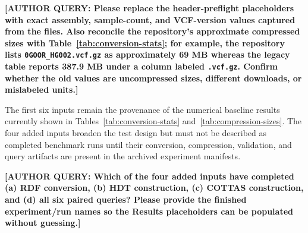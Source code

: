 \documentclass[pdflatex,sn-mathphys-num]{sn-jnl}%
\newenvironment{revision}{\begingroup\color{revisionblue}}{\endgroup}%
\newcommand{\authorquery}[1]{%
  \par\smallskip\noindent
  {\color{queryorange}\textbf{[AUTHOR QUERY: #1]}}%
  \par\smallskip
}%
\theoremstyle{thmstyleone}%
\theoremstyle{thmstyletwo}%
\theoremstyle{thmstylethree}%
\begin{document}
\authorquery{Please replace the header-preflight placeholders with exact assembly, sample-count, and VCF-version values captured from the files. Also reconcile the repository's approximate compressed sizes with Table~\ref{tab:conversion-stats}; for example, the repository lists \texttt{0GOOR\_HG002.vcf.gz} as approximately 69 MB whereas the legacy table reports 387.9 MB under a column labeled \texttt{.vcf.gz}. Confirm whether the old values are uncompressed sizes, different downloads, or mislabeled units.}

\begin{revision}
The first six inputs remain the provenance of the numerical baseline results currently shown in Tables~\ref{tab:conversion-stats} and~\ref{tab:compression-sizes}. The four added inputs broaden the test design but must not be described as completed benchmark runs until their conversion, compression, validation, and query artifacts are present in the archived experiment manifests.
\end{revision}
\authorquery{Which of the four added inputs have completed (a) RDF conversion, (b) HDT construction, (c) COTTAS construction, and (d) all six paired queries? Please provide the finished experiment/run names so the Results placeholders can be populated without guessing.}
\end{document}
